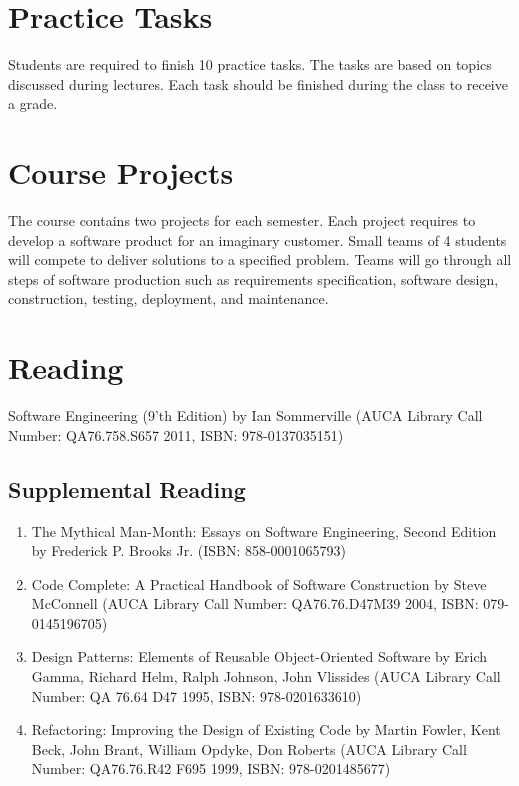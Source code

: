 \documentclass[12pt,a4paper,oneside]{article}
\begin{document}
    \section{Practice Tasks}

        Students are required to finish 10 practice tasks. The tasks are based on topics discussed during lectures. Each task should be finished during the class to receive a grade.

    \section{Course Projects}

        The course contains two projects for each semester. Each project requires to develop a software product for an imaginary customer. Small teams of 4 students will compete to deliver solutions to a specified problem. Teams will go through all steps of software production such as requirements specification, software design, construction, testing, deployment, and maintenance.

    \section{Reading}

        Software Engineering (9'th Edition) by Ian Sommerville (AUCA Library Call Number: QA76.758.S657 2011, ISBN: 978-0137035151)

            \subsection{Supplemental Reading}

                \begin{enumerate}
                    \item The Mythical Man-Month: Essays on Software Engineering, Second Edition by Frederick P. Brooks Jr. (ISBN: 858-0001065793)
                    \item Code Complete: A Practical Handbook of Software Construction by Steve McConnell (AUCA Library Call Number: QA76.76.D47M39 2004, ISBN: 079-0145196705)
                    \item Design Patterns: Elements of Reusable Object-Oriented Software by Erich Gamma, Richard Helm, Ralph Johnson, John Vlissides (AUCA Library Call Number: QA 76.64 D47 1995, ISBN: 978-0201633610)
                    \item Refactoring: Improving the Design of Existing Code by Martin Fowler, Kent Beck, John Brant, William Opdyke, Don Roberts (AUCA Library Call Number: QA76.76.R42 F695 1999, ISBN: 978-0201485677)
                \end{enumerate}
\end{document}
